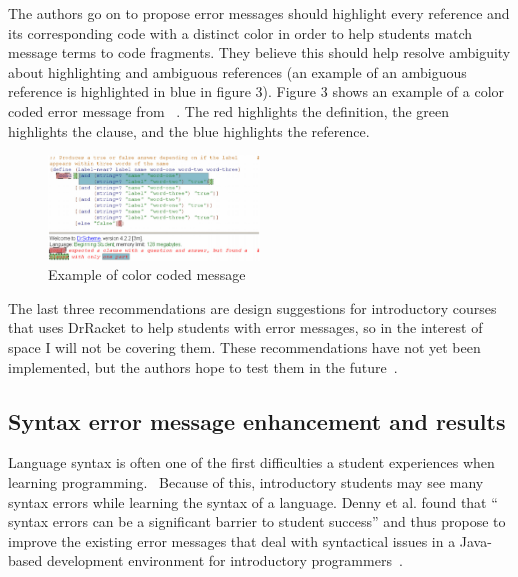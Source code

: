 \documentclass{sig-alternate}
\begin{document}
The authors go on to propose error messages should highlight every reference and its corresponding code with a distinct color in order to help students match message terms to code fragments.
They believe this should help resolve ambiguity about highlighting and ambiguous references (an example of an ambiguous reference is highlighted in blue in figure 3).
Figure 3 shows an example of a color coded error message from ~\cite{Marceau:2011:MYL:2048237.2048241}.
The red highlights the definition, the green highlights the clause, and the blue highlights the reference.

\begin{figure}
  \centering
  \includegraphics[keepaspectratio, width=0.5\textwidth]{DrRacketColorCodedMessage.png}
  \caption{Example of color coded message}
  \label{fig:colorcodedmessage}
\end{figure}

The last three recommendations are design suggestions for introductory courses that uses DrRacket to help students with error messages, so in the interest of space I will not be covering them.
These recommendations have not yet been implemented, but the authors hope to test them in the future~\cite{Marceau:2011:MYL:2048237.2048241}. 



\subsection{Syntax error message enhancement and results}\label{subsec:syntax enhancement}

Language syntax is often one of the first difficulties a student experiences when learning programming.~\cite{Denny:2011:USB:1999747.1999807}
Because of this, introductory students may see many syntax errors while learning the syntax of a language.
Denny et al. found that `` syntax errors can be a significant barrier to student success'' and thus propose to improve the existing error messages that deal with syntactical issues in a Java-based development environment for introductory programmers~\cite{Denny:2014:ESE:2591708.2591748}.
\end{document}
